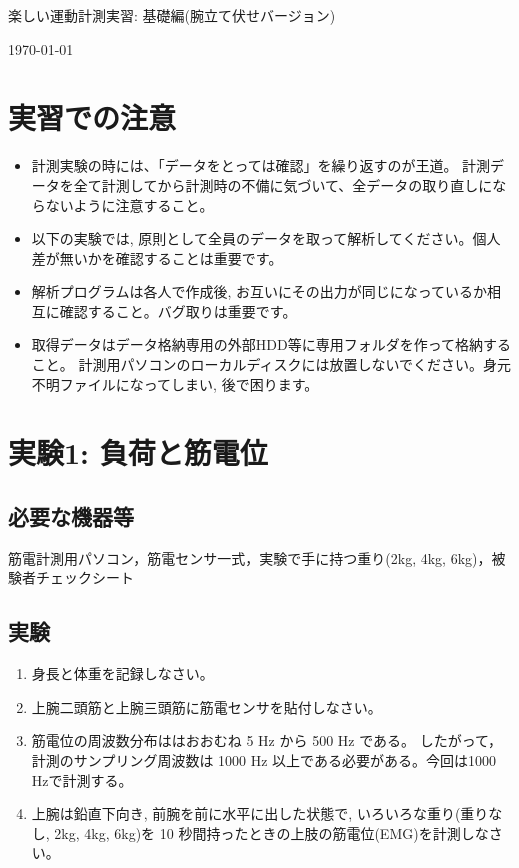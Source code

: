 \documentclass{jsarticle}
\begin{document}
\begin{center}
  {\LARGE 楽しい運動計測実習: 基礎編(腕立て伏せバージョン)}
\end{center}
\begin{flushright}
\today
\end{flushright}

\section*{実習での注意}
\begin{itemize}
\item 計測実験の時には、「データをとっては確認」を繰り返すのが王道。
  計測データを全て計測してから計測時の不備に気づいて、全データの取り直しにならないように注意すること。
\item 以下の実験では, 原則として全員のデータを取って解析してください。個人差が無いかを確認することは重要です。
\item 解析プログラムは各人で作成後, お互いにその出力が同じになっているか相互に確認すること。バグ取りは重要です。
\item 取得データはデータ格納専用の外部HDD等に専用フォルダを作って格納すること。
  計測用パソコンのローカルディスクには放置しないでください。身元不明ファイルになってしまい, 後で困ります。
\end{itemize}

\section{実験1: 負荷と筋電位}

\subsection{必要な機器等}

筋電計測用パソコン，筋電センサ一式，実験で手に持つ重り(2kg, 4kg, 6kg)，被験者チェックシート

\subsection{実験}

\begin{enumerate}
  \item 身長と体重を記録しなさい。
  \item 上腕二頭筋と上腕三頭筋に筋電センサを貼付しなさい。
  \item 筋電位の周波数分布ははおおむね 5 Hz から 500 Hz である。
  したがって，計測のサンプリング周波数は 1000 Hz 以上である必要がある。今回は1000 Hzで計測する。
  \item 上腕は鉛直下向き, 前腕を前に水平に出した状態で, いろいろな重り(重りなし, 2kg, 4kg, 6kg)を 10 秒間持ったときの上肢の筋電位(EMG)を計測しなさい。
\end{enumerate}  
\end{document}
